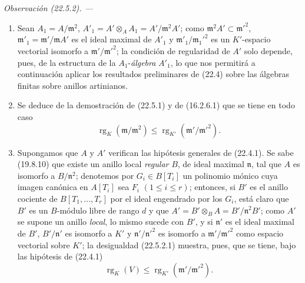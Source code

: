 \documentclass[10pt,oneside]{book}
\makeatletter
\newcommand{\setmanualcurrentlabel}[1]{\def\@currentlabel{#1}}
\newcommand{\oldpage}[2][]{%
  \setcounter{footnote}{0}%
  \marginpar{\scriptsize\textbf{#1}~|~#2}\ignorespaces}
\newenvironment{remark}[1][]{%
  \setmanualcurrentlabel{#1}\par\medskip\noindent\itshape Observación (#1). ---\ }{\par}
\makeatother
\begin{document}
\begin{remark}[22.5.2]
\label{0.22.5.2-es}
\begin{enumerate}
  \item[\rm(i)] Sean $A_1=A/\mathfrak m^2$,
  $A'_1=A'\otimes_AA_1=A'/\mathfrak m^2A'$; como
  $\mathfrak m^2A'\subset\mathfrak m'^2$,
  $\mathfrak m'_1=\mathfrak m'/\mathfrak mA'$ es el ideal maximal de $A'_1$
  y $\mathfrak m'_1/\mathfrak m_1'^2$ es un $K'$-espacio vectorial isomorfo
  a $\mathfrak m'/\mathfrak m'^2$; la condición de regularidad de $A'$ solo
  depende, pues, de la estructura de la $A_1$-\emph{álgebra} $A'_1$, lo que nos
  permitirá a continuación aplicar los resultados preliminares de (22.4) sobre
  las álgebras finitas sobre anillos artinianos.
  \item[\rm(ii)] Se deduce de la demostración de (22.5.1) y de (16.2.6.1)
  que se tiene en todo caso
  \begin{equation}
  \label{0.22.5.2.1-es}
    \operatorname{rg}_K(\mathfrak m/\mathfrak m^2)
    \leqslant\operatorname{rg}_{K'}(\mathfrak m'/\mathfrak m'^2).
    \tag{22.5.2.1}
  \end{equation}

  \oldpage[0\textsubscript{IV-1}]{202}

  \item[\rm(iii)] Supongamos que $A$ y $A'$ verifican las hipótesis generales
  de (22.4.1). Se sabe (19.8.10) que existe un anillo local \emph{regular}
  $B$, de ideal maximal $\mathfrak n$, tal que $A$ es isomorfo a
  $B/\mathfrak n^2$; denotemos por $G_i\in B[T_i]$ un polinomio mónico cuya
  imagen canónica en $A[T_i]$ sea $F_i$ $(1\leqslant i\leqslant r)$;
  entonces, si $B'$ es el anillo cociente de $B[T_1,\ldots,T_r]$ por el ideal
  engendrado por los $G_i$, está claro que $B'$ es un $B$-módulo libre de rango
  $d$ y que $A'=B'\otimes_BA=B'/\mathfrak n^2B'$; como $A'$ se supone un
  anillo \emph{local}, lo mismo sucede con $B'$, y si $\mathfrak n'$ es el ideal
  maximal de $B'$, $B'/\mathfrak n'$ es isomorfo a $K'$ y
  $\mathfrak n'/\mathfrak n'^2$ es isomorfo a $\mathfrak m'/\mathfrak m'^2$ como
  espacio vectorial sobre $K'$; la desigualdad (22.5.2.1) muestra, pues, que
  se tiene, bajo las hipótesis de (22.4.1)
  \begin{equation}
  \label{0.22.5.2.2-es}
    \operatorname{rg}_K(V)\leqslant\operatorname{rg}_{K'}(\mathfrak m'/\mathfrak m'^2).
    \tag{22.5.2.2}
  \end{equation}
\end{enumerate}
\end{remark}
\end{document}
